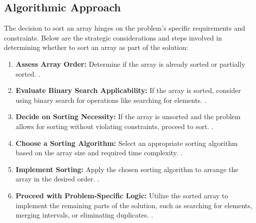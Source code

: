 \subsection*{Algorithmic Approach}
The decision to sort an array hinges on the problem's specific requirements and constraints. Below are the strategic considerations and steps involved in determining whether to sort an array as part of the solution:

\begin{enumerate}
    \item \textbf{Assess Array Order:} Determine if the array is already sorted or partially sorted.
    .
    
    \item \textbf{Evaluate Binary Search Applicability:} If the array is sorted, consider using binary search for operations like searching for elements.
    .
    
    \item \textbf{Decide on Sorting Necessity:} If the array is unsorted and the problem allows for sorting without violating constraints, proceed to sort.
    .
    
    \item \textbf{Choose a Sorting Algorithm:} Select an appropriate sorting algorithm based on the array size and required time complexity.
    .
    
    \item \textbf{Implement Sorting:} Apply the chosen sorting algorithm to arrange the array in the desired order.
    .
    
    \item \textbf{Proceed with Problem-Specific Logic:} Utilize the sorted array to implement the remaining parts of the solution, such as searching for elements, merging intervals, or eliminating duplicates.
    .
\end{enumerate}

